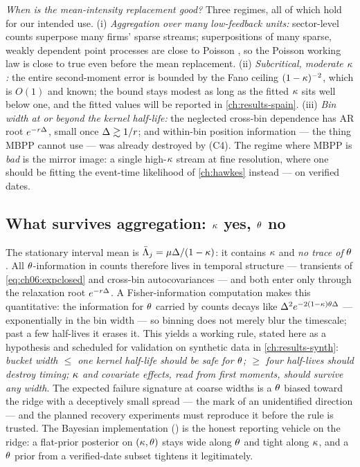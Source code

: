 \emph{When is the mean-intensity replacement good?} Three regimes, all of
which hold for our intended use. (i) \emph{Aggregation over many
low-feedback units:} sector-level counts superpose many firms' sparse
streams; superpositions of many sparse, weakly dependent point processes
are close to Poisson \citep[Ch.~9]{daley2003}, so the Poisson working law
is close to true even before the mean replacement. (ii) \emph{Subcritical,
moderate $\kappa$:} the entire second-moment error is bounded by the Fano
ceiling $(1-\kappa)^{-2}$, which is $O(1)$ and known; the bound stays
modest as long as the fitted $\kappa$ sits well below one, and the fitted
values will be reported in \cref{ch:results-spain}.
(iii) \emph{Bin width at or beyond the kernel half-life:} the neglected
cross-bin dependence has AR root $e^{-r\Delta}$, small once
$\Delta \gtrsim 1/r$; and within-bin position information --- the thing
MBPP cannot use --- was already destroyed by (C4). The regime where MBPP is
\emph{bad} is the mirror image: a single high-$\kappa$ stream at fine
resolution, where one should be fitting the event-time likelihood of
\cref{ch:hawkes} instead --- on verified dates.

\subsection{What survives aggregation: $\kappa$ yes, $\theta$ no}\label{ch06:sec:ridge}

The stationary interval mean is
$\bar{\Lambda}_j = \mu\Delta/(1-\kappa)$: it contains $\kappa$ and
\emph{no trace of} $\theta$. All $\theta$-information in counts therefore
lives in temporal structure --- transients of
\cref{eq:ch06:expclosed} and cross-bin autocovariances --- and both enter
only through the relaxation root $e^{-r\Delta}$. A Fisher-information
computation makes this quantitative: the information for $\theta$ carried
by counts decays like $\Delta^{2}e^{-2(1-\kappa)\theta\Delta}$ ---
exponentially in the bin width --- so binning does not merely blur the
timescale; past a few half-lives it erases it. This yields a working rule,
stated here as a hypothesis and scheduled for validation on synthetic data
in \cref{ch:results-synth}: \emph{bucket width $\le$ one kernel half-life
should be safe for $\theta$; $\ge$ four half-lives should destroy timing;
$\kappa$ and covariate effects, read from first moments, should survive
any width}. The expected failure signature at coarse widths is a $\theta$
biased toward the ridge with a deceptively small spread --- the mark of an
unidentified direction --- and the planned recovery experiments must
reproduce it before the rule is trusted. The Bayesian implementation
() is the honest reporting vehicle on the ridge: a
flat-prior posterior on $(\kappa,\theta)$ stays wide along $\theta$ and
tight along $\kappa$, and a $\theta$ prior from a verified-date subset
tightens it legitimately.

